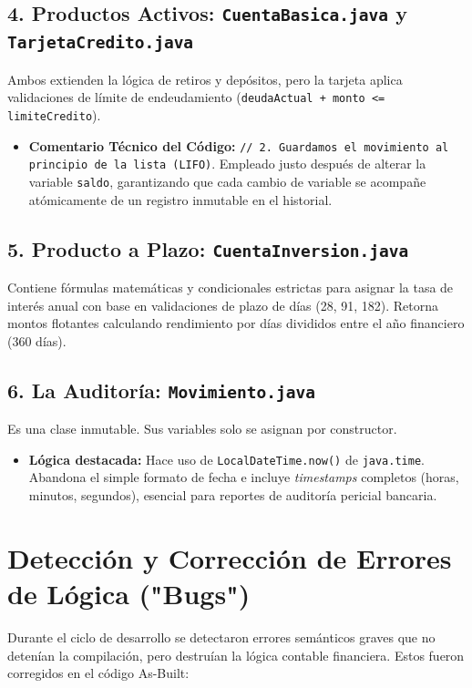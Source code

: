 \documentclass[12pt, letterpaper]{article}
\begin{document}
	\subsection{4. Productos Activos: \texttt{CuentaBasica.java} y \texttt{TarjetaCredito.java}}
	Ambos extienden la lógica de retiros y depósitos, pero la tarjeta aplica validaciones de límite de endeudamiento (\texttt{deudaActual + monto <= limiteCredito}).
	\begin{itemize}
		\item \textbf{Comentario Técnico del Código:} \texttt{// 2. Guardamos el movimiento al principio de la lista (LIFO)}. Empleado justo después de alterar la variable \texttt{saldo}, garantizando que cada cambio de variable se acompañe atómicamente de un registro inmutable en el historial.
	\end{itemize}
	
	\subsection{5. Producto a Plazo: \texttt{CuentaInversion.java}}
	Contiene fórmulas matemáticas y condicionales estrictas para asignar la tasa de interés anual con base en validaciones de plazo de días (28, 91, 182). Retorna montos flotantes calculando rendimiento por días divididos entre el año financiero (360 días).
	
	\subsection{6. La Auditoría: \texttt{Movimiento.java}}
	Es una clase inmutable. Sus variables solo se asignan por constructor.
	\begin{itemize}
		\item \textbf{Lógica destacada:} Hace uso de \texttt{LocalDateTime.now()} de \texttt{java.time}. Abandona el simple formato de fecha e incluye \textit{timestamps} completos (horas, minutos, segundos), esencial para reportes de auditoría pericial bancaria.
	\end{itemize}
	
	\section{Detección y Corrección de Errores de Lógica ("Bugs")}
	Durante el ciclo de desarrollo se detectaron errores semánticos graves que no detenían la compilación, pero destruían la lógica contable financiera. Estos fueron corregidos en el código As-Built:
	
\end{document}
